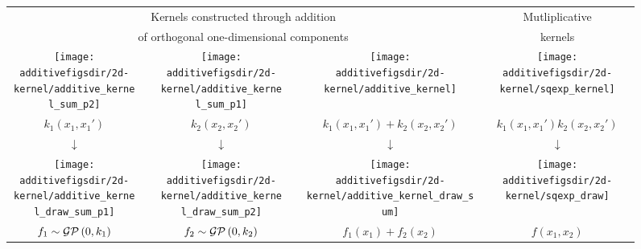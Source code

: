 \begin{figure}
\centering
\begin{tabular}{ccccc|c}
\multicolumn{5}{c|}{Kernels constructed through addition} & \multicolumn{1}{c}{Mutliplicative} \\
\multicolumn{5}{c|}{of orthogonal one-dimensional components} & \multicolumn{1}{c}{kernels} \\
\hspace{-0.2cm}\texttt{[image: \\additivefigsdir/2d-kernel/additive\_kernel\_sum\_p2]} 
& \hspace{-0.4cm} \raisebox{1cm}{+} \hspace{-0.4cm} & 
\texttt{[image: \\additivefigsdir/2d-kernel/additive\_kernel\_sum\_p1]} 
& \hspace{-0.4cm} \raisebox{1cm}{=} \hspace{-0.4cm} & 
\texttt{[image: \\additivefigsdir/2d-kernel/additive\_kernel]} &
\texttt{[image: \\additivefigsdir/2d-kernel/sqexp\_kernel]} \\
$k_1(x_1, x_1')$ & & $k_2(x_2, x_2')$ & & $k_1(x_1,x_1') + k_2(x_2,x_2')$ &$k_1(x_1,x_1')k_2(x_2,x_2')$ \\[1em]
\large $\downarrow$ & & \large $\downarrow$ & & \large $\downarrow$ & \large $\downarrow$  \\[-0.2em]
\hspace{-0.2cm}\texttt{[image: \\additivefigsdir/2d-kernel/additive\_kernel\_draw\_sum\_p1]}
& \hspace{-0.4cm} \raisebox{1cm}{+} \hspace{-0.4cm} & 
\texttt{[image: \\additivefigsdir/2d-kernel/additive\_kernel\_draw\_sum\_p2]}
& \hspace{-0.4cm} \raisebox{1cm}{=} \hspace{-0.4cm} &
\texttt{[image: \\additivefigsdir/2d-kernel/additive\_kernel\_draw\_sum]} &
\texttt{[image: \\additivefigsdir/2d-kernel/sqexp\_draw]} \\
$f_1 \sim \mathcal{GP}\left(0, k_1\right)$ & & $f_2 \sim \mathcal{GP}\left(0, k_2\right)$ & & $f_1(x_1) + f_2(x_2)$ & $f(x_1, x_2)$ \\

\end{tabular}
\end{figure}
